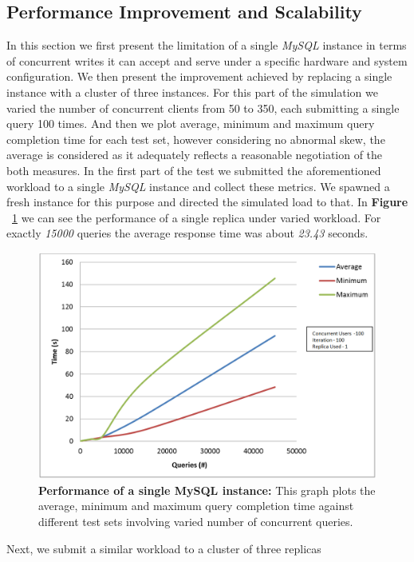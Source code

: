 \documentclass[12pt]{article}
\begin{document}
\subsection{Performance Improvement and Scalability} 
In this section we first present the limitation of a single \emph{MySQL} instance
in terms of concurrent writes it can accept and serve under a specific hardware
and system configuration. We then present the improvement achieved by replacing
a single instance with a cluster of three instances. For this part of the
simulation we varied the number of concurrent clients from 50 to 350, each
submitting a single query 100 times. And then we plot average, minimum and
maximum query completion time for each test set, however considering no abnormal skew, the average is considered
as it adequately reflects a reasonable negotiation of the both
measures. In the first part of the test we submitted the aforementioned workload
to a single \emph{MySQL} instance and collect these metrics. We spawned a fresh
instance for this purpose and directed the simulated load to that. In
\textbf{Figure }~\ref{fig:singlereplica} we can see the performance of a single
replica under varied workload. For exactly \emph{15000} queries the average
response time was about \emph{23.43} seconds.  
\begin{figure}[H] 
\centering
\includegraphics[scale=0.45]{Images/graph_singlereplica.PNG}
\caption{\textbf{Performance of a single MySQL instance:} This graph plots the
average, minimum and maximum query completion time against different test sets
involving varied number of concurrent queries. } \label{fig:singlereplica}
\end{figure} 
Next, we submit a similar workload to a cluster of three replicas
\end{document}
